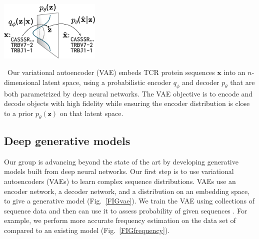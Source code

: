 \documentclass[nobib]{tufte-handout}
\begin{document}
\begin{marginfigure}[0.1in]%
\begin{centering}
    \includegraphics[width=1.9in]{figures/vae.pdf}
\end{centering}
  \caption{\
    Our variational autoencoder (VAE) embeds TCR protein sequences $\mathbf{x}$ into an $n$-dimensional latent space, using a probabilistic encoder $q_\phi$ and decoder $p_\theta$ that are both parametrized by deep neural networks.
The VAE objective is to encode and decode objects with high fidelity while ensuring the encoder distribution is close to a prior $p_\theta(\mathbf{z})$ on that latent space.
    }
  \label{FIGvae}
\end{marginfigure}%



\subsection*{Deep generative models}
Our group is advancing beyond the state of the art by developing generative models built from deep neural networks.
Our first step is to use variational autoencoders (VAEs) \cite{Kingma2014-mo} to learn complex sequence distributions.
VAEs use an encoder network, a decoder network, and a distribution on an embedding space, to give a generative model (Fig.~\ref{FIGvae}).
We train the VAE using collections of sequence data and then can use it to assess probability of given sequences \cite{Davidsen2019-uw}.
For example, we perform more accurate frequency estimation on the data set of \cite{Emerson2017-co} compared to an existing model (Fig.~\ref{FIGfrequency}).
\end{document}
